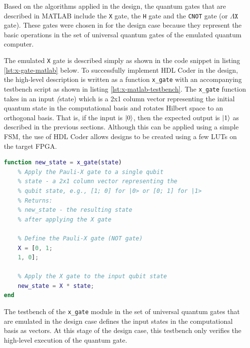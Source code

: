 Based on the algorithms applied in the design, the quantum gates that are described in MATLAB include the \texttt{X} gate, the \texttt{H} gate and the \texttt{CNOT} gate (or $\Lambda \texttt{X}$ gate). These gates were chosen in for the design case because they represent the basic operations in the set of universal quantum gates of the emulated quantum computer.

The emulated \texttt{X} gate is described simply as shown in the code snippet in listing \ref{lst:x-gate-matlab} below. To successfully implement HDL Coder in the design, the high-level description is written as a function \texttt{x\_gate} with an accompanying testbench script as shown in listing \ref{lst:x-matlab-testbench}. The \texttt{x\_gate} function takes in an input \textit(state) which is a 2x1 column vector representing the initial quantum state in the computational basis and rotates Hilbert space to an orthogonal basis. That is, if the input is $\ket{0}$, then the expected output is $\ket{1}$ as described in the previous sections. Although this can be applied using a simple FSM, the use of HDL Coder allows designs to be created using a few LUTs on the target FPGA.
\begin{lstlisting}[language=Matlab, caption={Code snippet of the MATLAB high-level description of the \texttt{X} gate applied to a single qubit in the state $\ket{0}$.}, label={lst:x-gate-matlab}]
function new_state = x_gate(state)
	% Apply the Pauli-X gate to a single qubit
	% state - a 2x1 column vector representing the
	% qubit state, e.g., [1; 0] for |0> or [0; 1] for |1>
	% Returns:
	% new_state - the resulting state 
	% after applying the X gate
	
	% Define the Pauli-X gate (NOT gate)
	X = [0, 1; 
	1, 0];
	
	% Apply the X gate to the input qubit state
	new_state = X * state;
end
\end{lstlisting}
The testbench of the \texttt{x\_gate} module in the set of universal quantum gates that are emulated in the design case defines the input states in the computational basis as vectors. At this stage of the design case, this testbench only verifies the high-level execution of the quantum gate. 
